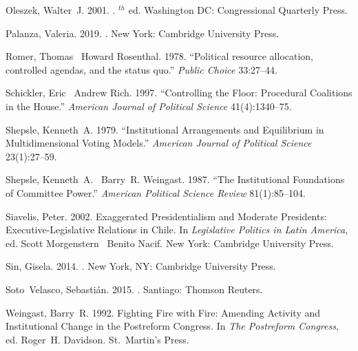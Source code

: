 \documentclass[letter,12pt]{article}
\begin{document}
\begin{thebibliography}{xx}
Oleszek, Walter~J. 2001.
.
$^{th}$ ed. Washington DC:  Congressional Quarterly Press.

Palanza, Valeria. 2019.
.
\newblock New York:  Cambridge University Press.

Romer, Thomas \harvardand\ Howard Rosenthal. 1978.
\newblock ``Political resource allocation, controlled agendas, and the status
  quo.'' {\em Public Choice} 33:27--44.

Schickler, Eric \harvardand\ Andrew Rich. 1997.
\newblock ``Controlling the Floor: Procedural Coalitions in the {H}ouse.'' {\em
  American Journal of Political Science} 41(4):1340--75.

Shepsle, Kenneth~A. 1979.
\newblock ``Institutional Arrangements and Equilibrium in Multidimensional
  Voting Models.'' {\em American Journal of Political Science} 23(1):27--59.

Shepsle, Kenneth~A. \harvardand\ Barry~R. Weingast. 1987.
\newblock ``The Institutional Foundations of Committee Power.'' {\em American
  Political Science Review} 81(1):85--104.

Siavelis, Peter. 2002.
\newblock Exaggerated Presidentialism and Moderate Presidents:
  Executive-Legislative Relations in {Chile}.  In {\em Legislative Politics in
  Latin America}, ed. Scott Morgenstern \harvardand\ Benito Nacif.
\newblock New York:  Cambridge University Press.

Sin, Gisela. 2014.
.
\newblock New York, NY:  Cambridge University Press.

Soto~Velasco, Sebasti\'an. 2015.
.
\newblock Santiago:  Thomson Reuters.

Weingast, Barry~R. 1992.
\newblock Fighting Fire with Fire: Amending Activity and Institutional Change
  in the Postreform Congress.  In {\em The Postreform Congress}, ed. Roger~H.
  Davidson.
\newblock St.\ Martin's Press.

\end{thebibliography}
\end{document}

